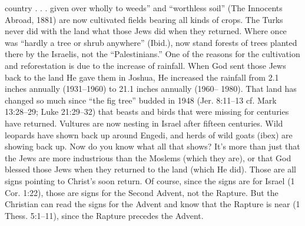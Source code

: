 {country . . . given over wholly to weeds” and
“worthless soil” (The Innocents Abroad, 1881)
are now cultivated fields bearing all kinds of
crops. The Turks never did with the land what
those Jews did when they returned.
Where once was “hardly a tree or shrub
anywhere” (Ibid.), now stand forests of trees
planted there by the Israelis, not the
“Palestinians.” One of the reasons for the
cultivation and reforestation is due to the
increase of rainfall. When God sent those Jews
back to the land He gave them in Joshua, He
increased the rainfall from 2.1 inches annually
(1931–1960) to 21.1 inches annually (1960–
1980).
That land has changed so much since “the
fig tree” budded in 1948 (Jer. 8:11–13 cf.
Mark 13:28–29; Luke 21:29–32) that beasts
and birds that were missing for centuries have
returned. Vultures are now nesting in Israel
after fifteen centuries. Wild leopards have
shown back up around Engedi, and herds of
wild goats (ibex) are showing back up.
Now do you know what all that shows? It’s
more than just that the Jews are more
industrious than the Moslems (which they are),
or that God blessed those Jews when they
returned to the land (which He did). Those are
all signs pointing to Christ’s soon return. Of
course, since the signs are for Israel (1 Cor.
1:22), those are signs for the Second Advent,
not the Rapture. But the Christian can read the
signs for the Advent and know that the Rapture
is near (1 Thess. 5:1–11), since the Rapture
precedes the Advent.}
